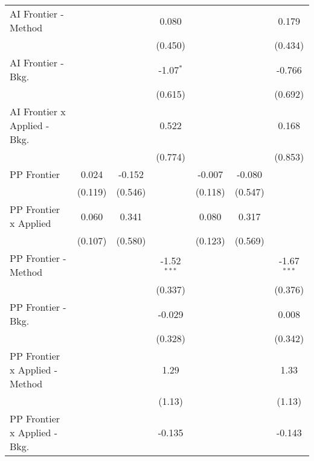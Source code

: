 \begin{tabular}{lcccccc}
   AI Frontier - Method           &         &             & 0.080         &              &             & 0.179\\   
                                  &         &             & (0.450)       &              &             & (0.434)\\   
   AI Frontier - Bkg.             &         &             & -1.07$^{*}$   &              &             & -0.766\\   
                                  &         &             & (0.615)       &              &             & (0.692)\\   
   AI Frontier x Applied - Bkg.   &         &             & 0.522         &              &             & 0.168\\   
                                  &         &             & (0.774)       &              &             & (0.853)\\   
   PP Frontier                    & 0.024   & -0.152      &               & -0.007       & -0.080      &   \\   
                                  & (0.119) & (0.546)     &               & (0.118)      & (0.547)     &   \\   
   PP Frontier x Applied          & 0.060   & 0.341       &               & 0.080        & 0.317       &   \\   
                                  & (0.107) & (0.580)     &               & (0.123)      & (0.569)     &   \\   
   PP Frontier - Method           &         &             & -1.52$^{***}$ &              &             & -1.67$^{***}$\\   
                                  &         &             & (0.337)       &              &             & (0.376)\\   
   PP Frontier - Bkg.             &         &             & -0.029        &              &             & 0.008\\   
                                  &         &             & (0.328)       &              &             & (0.342)\\   
   PP Frontier x Applied - Method &         &             & 1.29          &              &             & 1.33\\   
                                  &         &             & (1.13)        &              &             & (1.13)\\   
   PP Frontier x Applied - Bkg.   &         &             & -0.135        &              &             & -0.143\\   

\end{tabular}

